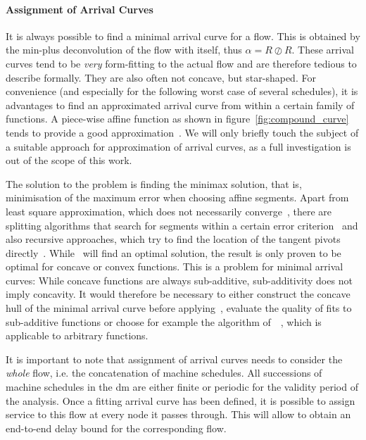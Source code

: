 \paragraph{Assignment of Arrival Curves}
It is always possible to find a minimal arrival curve for a flow. This is obtained by the min-plus deconvolution of the flow with itself, thus $\alpha = R \oslash R$.
These arrival curves tend to be \emph{very} form-fitting to the actual flow and are therefore tedious to describe formally. They are also often not concave, but star-shaped. For convenience (and especially for the following worst case of several schedules),
it is advantages to find an approximated arrival curve from within a certain family of functions. A piece-wise affine function as shown in figure~\ref{fig:compound_curve} tends to provide a good approximation~\cite[p. ]{thiran_network_2001}.
We will only briefly touch the subject of a suitable approach for approximation of arrival curves, as a full investigation is out of the scope of this work.
\par
The solution to the problem is finding the minimax solution, that is, minimisation of the maximum error when choosing affine segments. Apart from least square approximation, which does not necessarily converge~\cite{imamoto_recursive_2008},
there are splitting algorithms that search for segments within a certain error criterion~\cite{vandewalle_calculation_1975} and also recursive approaches, which try to find the location of the tangent pivots directly~\cite{imamoto_recursive_2008}.
While~\cite{imamoto_recursive_2008} will find an optimal solution, the result is only proven to be optimal for concave or convex functions. 
This is a problem for minimal arrival curves: While concave functions are always sub-additive, sub-additivity does not imply concavity.
It would therefore be necessary to either construct the concave hull of the minimal arrival curve before applying~\cite{imamoto_recursive_2008}, evaluate the quality of fits to sub-additive functions or choose for example the algorithm of~\citeauthor{vandewalle_calculation_1975}~\cite{vandewalle_calculation_1975}, which is applicable to arbitrary functions.
\par
It is important to note that assignment of arrival curves needs to consider the \emph{whole} flow, i.e. the concatenation of machine schedules.
All successions of machine schedules in the \gls{dm} are either finite or periodic for the validity period of the analysis.
Once a fitting arrival curve has been defined, it is possible to assign service to this flow at every node it passes through.
This will allow to obtain an end-to-end delay bound for the corresponding flow.

